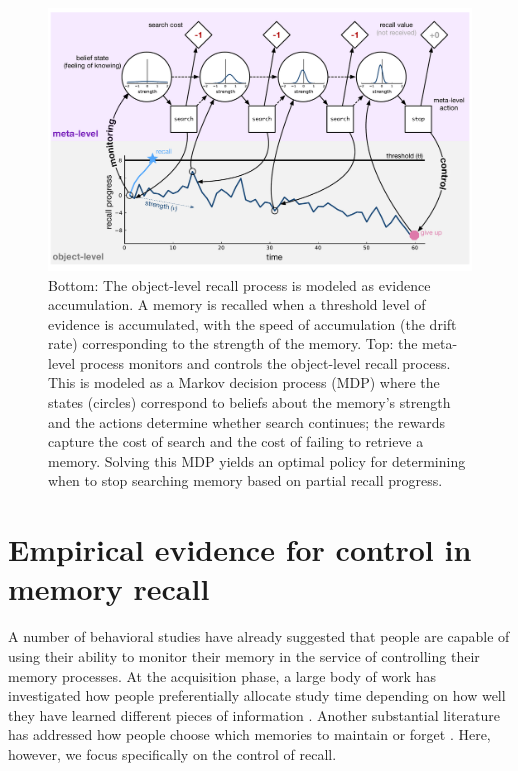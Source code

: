 \begin{figure}[ht]
  \centering
  \includegraphics[width=\textwidth]{figs/memory/model.pdf}
  \caption{
    Bottom: The object-level recall process is modeled as evidence accumulation. A memory is recalled when a threshold level of evidence is accumulated, with the speed of accumulation (the drift rate) corresponding to the strength of the memory. Top: the meta-level process monitors and controls the object-level recall process. This is modeled as a Markov decision process (MDP) where the states (circles) correspond to beliefs about the memory's strength and the actions determine whether search continues; the rewards capture the cost of search and the cost of failing to retrieve a memory. Solving this MDP yields an optimal policy for determining when to stop searching memory based on partial recall progress.}
  \label{fig:model-diagram}
\end{figure}

\section{Empirical evidence for control in memory recall}

A number of behavioral studies have already suggested that people are capable of using their ability to monitor their memory in the service of controlling their memory processes. At the acquisition phase, a large body of work has investigated how people preferentially allocate study time depending on how well they have learned different pieces of information \citep{dunlosky1998training,metcalfe2009metacognitive,gureckis2012selfdirected}. Another substantial literature has addressed how people choose which memories to maintain or forget \citep{castel2007adaptive,williams2013benefit,suchow2016deciding,hu2019role}. Here, however, we focus specifically on the control of recall.

